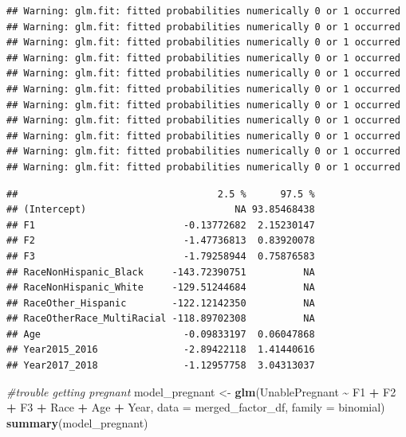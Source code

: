 \documentclass[
]{article}
\newenvironment{Shaded}{\begin{snugshade}}{\end{snugshade}}
\newcommand{\AttributeTok}[1]{\textcolor[rgb]{0.13,0.29,0.53}{#1}}
\newcommand{\CommentTok}[1]{\textcolor[rgb]{0.56,0.35,0.01}{\textit{#1}}}
\newcommand{\FunctionTok}[1]{\textcolor[rgb]{0.13,0.29,0.53}{\textbf{#1}}}
\newcommand{\NormalTok}[1]{#1}
\newcommand{\OtherTok}[1]{\textcolor[rgb]{0.56,0.35,0.01}{#1}}
\newcommand{\SpecialCharTok}[1]{\textcolor[rgb]{0.81,0.36,0.00}{\textbf{#1}}}
\begin{document}
\begin{verbatim}
## Warning: glm.fit: fitted probabilities numerically 0 or 1 occurred
## Warning: glm.fit: fitted probabilities numerically 0 or 1 occurred
## Warning: glm.fit: fitted probabilities numerically 0 or 1 occurred
## Warning: glm.fit: fitted probabilities numerically 0 or 1 occurred
## Warning: glm.fit: fitted probabilities numerically 0 or 1 occurred
## Warning: glm.fit: fitted probabilities numerically 0 or 1 occurred
## Warning: glm.fit: fitted probabilities numerically 0 or 1 occurred
## Warning: glm.fit: fitted probabilities numerically 0 or 1 occurred
## Warning: glm.fit: fitted probabilities numerically 0 or 1 occurred
## Warning: glm.fit: fitted probabilities numerically 0 or 1 occurred
## Warning: glm.fit: fitted probabilities numerically 0 or 1 occurred
\end{verbatim}

\begin{verbatim}
##                                   2.5 %      97.5 %
## (Intercept)                          NA 93.85468438
## F1                          -0.13772682  2.15230147
## F2                          -1.47736813  0.83920078
## F3                          -1.79258944  0.75876583
## RaceNonHispanic_Black     -143.72390751          NA
## RaceNonHispanic_White     -129.51244684          NA
## RaceOther_Hispanic        -122.12142350          NA
## RaceOtherRace_MultiRacial -118.89702308          NA
## Age                         -0.09833197  0.06047868
## Year2015_2016               -2.89422118  1.41440616
## Year2017_2018               -1.12957758  3.04313037
\end{verbatim}

\begin{Shaded}
\begin{Highlighting}[]
\CommentTok{\#trouble getting pregnant}
\NormalTok{model\_pregnant }\OtherTok{\textless{}{-}} \FunctionTok{glm}\NormalTok{(UnablePregnant }\SpecialCharTok{\textasciitilde{}}\NormalTok{ F1 }\SpecialCharTok{+}\NormalTok{ F2 }\SpecialCharTok{+}\NormalTok{ F3 }\SpecialCharTok{+}\NormalTok{ Race }\SpecialCharTok{+}\NormalTok{ Age }\SpecialCharTok{+}\NormalTok{ Year, }\AttributeTok{data =}\NormalTok{ merged\_factor\_df,}
                      \AttributeTok{family =}\NormalTok{ binomial)}
\FunctionTok{summary}\NormalTok{(model\_pregnant)}
\end{Highlighting}
\end{Shaded}
\end{document}
